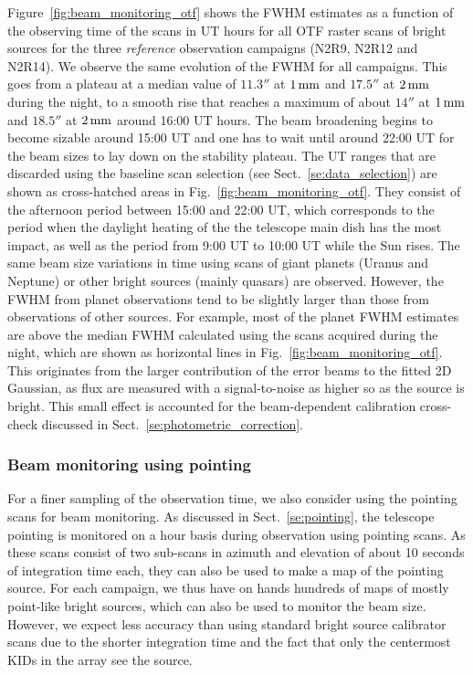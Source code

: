 Figure~\ref{fig:beam_monitoring_otf} shows the FWHM estimates as a %
function of the observing time of the scans in UT hours for all OTF raster
scans of bright sources for the three \emph{reference} observation
campaigns (N2R9, N2R12 and N2R14). We observe the same evolution of
the FWHM for all campaigns.
This goes from a plateau at a median value of $11.3''$ at $1\,\rm{mm}$
and $17.5''$ at $2\,\rm{mm}$ during the night, to a smooth rise that
reaches a maximum of about $14''$ at $1\,\rm{mm}$ and $18.5''$ at
$2\,\rm{mm}$ around 16:00 UT
hours. The beam broadening begins to become sizable around 15:00 UT
and one has to wait until around 22:00 UT for the beam sizes to lay
down on the stability plateau. The UT ranges that are discarded
using the baseline scan selection (see
Sect.~\ref{se:data_selection}) are shown as cross-hatched areas in
Fig.~\ref{fig:beam_monitoring_otf}. They consist of the afternoon
period between 15:00 and 22:00 UT, which corresponds to the period
when the daylight heating of the the telescope main dish has the most
impact, as well as the period from 9:00 UT to 10:00 UT while the Sun rises.
The same beam size variations in time using scans of giant planets (Uranus and
Neptune) or other bright
sources (mainly quasars) are observed. However, the FWHM from planet %
observations tend to be slightly larger than those from observations
of other sources. {\lp For example, most of the planet FWHM estimates
are above the median FWHM calculated using the scans acquired during the
night, which are shown as horizontal lines in Fig.~\ref{fig:beam_monitoring_otf}.}
This originates from the larger contribution of the
error beams to the fitted 2D Gaussian, as flux are measured with 
a signal-to-noise as higher so as the source is bright. This small
effect is accounted for the beam-dependent calibration cross-check
discussed in Sect.~\ref{se:photometric_correction}.


\subsubsection{Beam monitoring using pointing}
\label{se:beam_monitoring_pointing}

For a finer sampling of the observation time, we also consider using
the pointing scans for beam monitoring. As discussed in
Sect.~\ref{se:pointing}, the telescope pointing is
monitored on a hour basis during observation using pointing
scans. As these scans consist of two sub-scans in azimuth and
elevation of about 10 seconds of integration time each, they
can also be used to make a map of the pointing source. For each campaign,
we thus have on hands hundreds of maps of mostly point-like bright
sources, which can also be used to monitor the beam size. However, we
expect less accuracy than using standard bright source calibrator scans due to the
shorter integration time and the fact that only the centermost KIDs in
the array see the source.  

